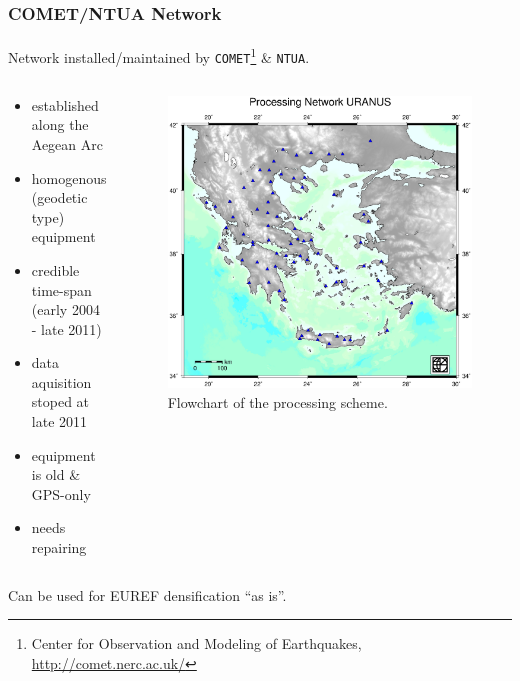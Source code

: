 \documentclass{beamer}
\begin{document}
\begin{frame}\frametitle{COMET/NTUA Network}\framesubtitle{}
  Network installed/maintained by \texttt{COMET}\footnote{Center for Observation and Modeling of Earthquakes, \url{http://comet.nerc.ac.uk/}} \& \texttt{NTUA}.
\begin{columns}[T] %
\begin{column}{.48\textwidth}
  {\small
  \begin{itemize}
    \setlength\itemsep{.1em}
    \item<pro@1-> established along the Aegean Arc
    \item<pro@1-> homogenous (geodetic type) equipment
    \item<pro@1-> credible time-span (early 2004 - late 2011)
    \item<con@1-> data aquisition stoped at late 2011
    \item<con@1-> equipment is old \& GPS-only
    \item<con@1-> needs repairing
\end{itemize}
}
\end{column}%
\hfill%
\begin{column}{.68\textwidth}
 \begin{figure}
 \begin{center}
 \includegraphics[width=.6\textwidth]{img/uranusnet.eps}
 \caption{Flowchart of the processing scheme.}
 \label{fig:dgrm}
 \end{center}
 \end{figure}
\end{column}%
\end{columns}
  \begin{block}{}
    Can be used for EUREF densification ``as is''.
  \end{block}
\end{frame}
\end{document}
